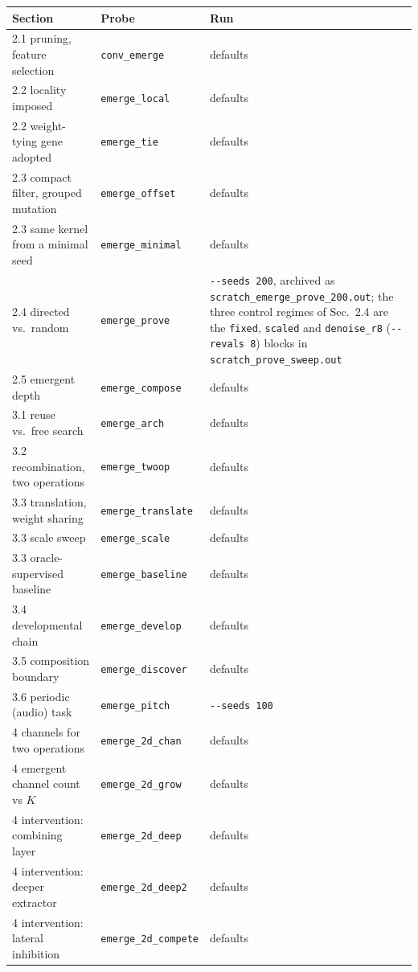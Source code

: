 \documentclass[11pt]{article}
\begin{document}
\begin{table}[ht]
\centering\small
\begin{tabular}{@{}llp{}@{}}
\toprule
Section & Probe & Run \\
\midrule
2.1 pruning, feature selection      & \texttt{conv\_emerge}     & defaults \\
2.2 locality imposed                & \texttt{emerge\_local}    & defaults \\
2.2 weight-tying gene adopted       & \texttt{emerge\_tie}      & defaults \\
2.3 compact filter, grouped mutation& \texttt{emerge\_offset}   & defaults \\
2.3 same kernel from a minimal seed & \texttt{emerge\_minimal}  & defaults \\
2.4 directed vs.\ random            & \texttt{emerge\_prove}    & \texttt{-{}-seeds 200}, archived as \texttt{scratch\_emerge\_prove\_200.out}; the three control regimes of Sec.~2.4 are the \texttt{fixed}, \texttt{scaled} and \texttt{denoise\_r8} (\texttt{-{}-revals 8}) blocks in \texttt{scratch\_prove\_sweep.out} \\
2.5 emergent depth                  & \texttt{emerge\_compose}  & defaults \\
3.1 reuse vs.\ free search          & \texttt{emerge\_arch}     & defaults \\
3.2 recombination, two operations   & \texttt{emerge\_twoop}    & defaults \\
3.3 translation, weight sharing     & \texttt{emerge\_translate}& defaults \\
3.3 scale sweep                     & \texttt{emerge\_scale}    & defaults \\
3.3 oracle-supervised baseline      & \texttt{emerge\_baseline} & defaults \\
3.4 developmental chain             & \texttt{emerge\_develop}  & defaults \\
3.5 composition boundary            & \texttt{emerge\_discover} & defaults \\
3.6 periodic (audio) task           & \texttt{emerge\_pitch}    & \texttt{-{}-seeds 100} \\
4 channels for two operations       & \texttt{emerge\_2d\_chan}  & defaults \\
4 emergent channel count vs $K$     & \texttt{emerge\_2d\_grow}  & defaults \\
4 intervention: combining layer     & \texttt{emerge\_2d\_deep}  & defaults \\
4 intervention: deeper extractor    & \texttt{emerge\_2d\_deep2} & defaults \\
4 intervention: lateral inhibition  & \texttt{emerge\_2d\_compete} & defaults \\
\bottomrule
\end{tabular}
\end{table}
\end{document}
